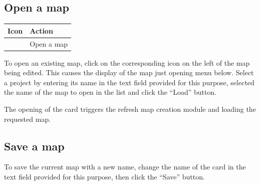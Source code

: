 \documentclass[letterpaper,10pt,english]{sphinxmanual}
\begin{document}
\subsection{Open a map}
\label{maps/layerstree:ouvrir-une-carte}
\begin{tabulary}{\linewidth}{|L|L|}
\hline

\textbf{Icon}
 & 
\textbf{Action}
\\
\hline
{}
 & 
Open a map
\\
\hline\end{tabulary}


To open an existing map, click on the corresponding icon on the left of the map being edited. This causes the display of the map just opening menu below. Select a project by entering its name in the text field provided for this purpose, selected the name of the map to open in the list and click the ``Load'' button.


The opening of the card triggers the refresh map creation module and loading the requested map.


\subsection{Save a map}
\label{maps/layerstree:enregistrer-une-carte}
To save the current map with a new name, change the name of the card in the text field provided for this purpose, then click the ``Save'' button.

\end{document}
